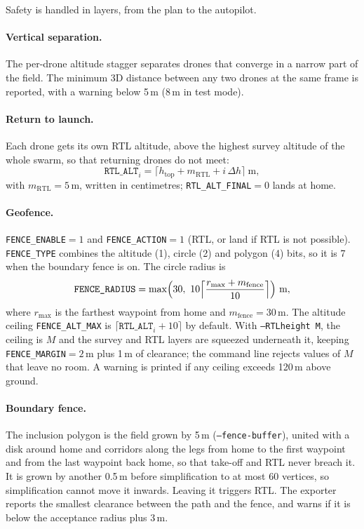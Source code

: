 \documentclass[11pt,a4paper]{article}
\newcommand{\code}[1]{\texttt{#1}}
\begin{document}
Safety is handled in layers, from the plan to the autopilot.

\paragraph{Vertical separation.} The per-drone altitude stagger separates drones that converge in a narrow
part of the field. The minimum 3D distance between any two drones at the same frame is reported, with a
warning below 5\,m (8\,m in test mode).

\paragraph{Return to launch.} Each drone gets its own RTL altitude, above the highest survey altitude of
the whole swarm, so that returning drones do not meet:
\begin{equation}
\code{RTL\_ALT}_i = \bigl\lceil h_{\text{top}} + m_{\text{RTL}} + i\,\Delta h \bigr\rceil\ \text{m},
\end{equation}
with $m_{\text{RTL}}=5$\,m, written in centimetres; \code{RTL\_ALT\_FINAL}$=0$ lands at home.

\paragraph{Geofence.} \code{FENCE\_ENABLE}$=1$ and \code{FENCE\_ACTION}$=1$ (RTL, or land if RTL is not
possible). \code{FENCE\_TYPE} combines the altitude (1), circle (2) and polygon (4) bits, so it is 7 when the
boundary fence is on. The circle radius is
\begin{equation}
\code{FENCE\_RADIUS} = \max\Bigl(30,\ 10\Bigl\lceil \frac{r_{\max}+m_{\text{fence}}}{10}\Bigr\rceil\Bigr)\ \text{m},
\end{equation}
where $r_{\max}$ is the farthest waypoint from home and $m_{\text{fence}}=30$\,m. The altitude ceiling
\code{FENCE\_ALT\_MAX} is $\lceil \code{RTL\_ALT}_i + 10\rceil$ by default. With \code{--RTLheight M}, the
ceiling is $M$ and the survey and RTL layers are squeezed underneath it, keeping \code{FENCE\_MARGIN}$=2$\,m
plus 1\,m of clearance; the command line rejects values of $M$ that leave no room. A warning is printed if
any ceiling exceeds 120\,m above ground.

\paragraph{Boundary fence.} The inclusion polygon is the field grown by 5\,m (\code{--fence-buffer}),
united with a disk around home and corridors along the legs from home to the first waypoint and from the
last waypoint back home, so that take-off and RTL never breach it. It is grown by another 0.5\,m before
simplification to at most 60 vertices, so simplification cannot move it inwards. Leaving it triggers RTL.
The exporter reports the smallest clearance between the path and the fence, and warns if it is below the
acceptance radius plus 3\,m.
\end{document}

